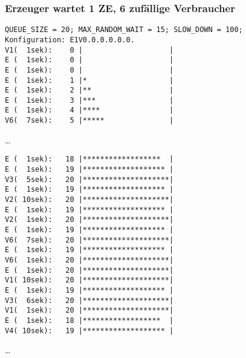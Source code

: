\subsubsection{Erzeuger wartet 1 ZE, 6 zufällige Verbraucher} %
\label{ssub:zufalliger_erzeuger_3_zufallige_verbraucher}
\begin{quellcode}[H]
\begin{scriptsize}
\begin{spacing}{1.0}
\begin{verbatim}
QUEUE_SIZE = 20; MAX_RANDOM_WAIT = 15; SLOW_DOWN = 100;
Konfiguration: E1V0.0.0.0.0.0.
V1(  1sek):    0 |                    |
E (  1sek):    0 |                    |
E (  1sek):    0 |                    |
E (  1sek):    1 |*                   |
E (  1sek):    2 |**                  |
E (  1sek):    3 |***                 |
E (  1sek):    4 |****                |
V6(  7sek):    5 |*****               |
\end{verbatim}

…

\begin{verbatim}
E (  1sek):   18 |******************  |
E (  1sek):   19 |******************* |
V3(  5sek):   20 |********************|
E (  1sek):   19 |******************* |
V2( 10sek):   20 |********************|
E (  1sek):   19 |******************* |
V2(  1sek):   20 |********************|
E (  1sek):   19 |******************* |
V6(  7sek):   20 |********************|
E (  1sek):   19 |******************* |
V6(  1sek):   20 |********************|
E (  1sek):   20 |********************|
V1( 10sek):   20 |********************|
E (  1sek):   19 |******************* |
V3(  6sek):   20 |********************|
V1(  1sek):   20 |********************|
E (  1sek):   18 |******************  |
V4( 10sek):   19 |******************* |
\end{verbatim}

…


\end{spacing}
\end{scriptsize}
\end{quellcode}
